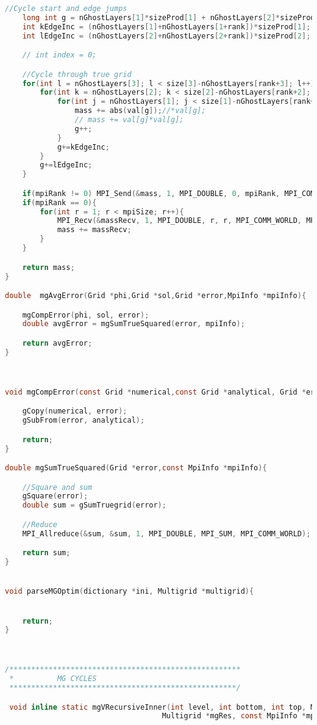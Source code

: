 \begin{lstlisting}[language=c, caption = main routine]
	//Cycle start and edge jumps
	long int g = nGhostLayers[1]*sizeProd[1] + nGhostLayers[2]*sizeProd[2] + nGhostLayers[3]*sizeProd[3];
	int kEdgeInc = (nGhostLayers[1]+nGhostLayers[1+rank])*sizeProd[1];
	int lEdgeInc = (nGhostLayers[2]+nGhostLayers[2+rank])*sizeProd[2];

	// int index = 0;

	//Cycle through true grid
	for(int l = nGhostLayers[3]; l < size[3]-nGhostLayers[rank+3]; l++){
		for(int k = nGhostLayers[2]; k < size[2]-nGhostLayers[rank+2]; k++){
			for(int j = nGhostLayers[1]; j < size[1]-nGhostLayers[rank+1]; j++){
				mass += abs(val[g]);//*val[g];
				// mass += val[g]*val[g];
				g++;
			}
			g+=kEdgeInc;
		}
		g+=lEdgeInc;
	}

	if(mpiRank != 0) MPI_Send(&mass, 1, MPI_DOUBLE, 0, mpiRank, MPI_COMM_WORLD);
	if(mpiRank == 0){
		for(int r = 1; r < mpiSize; r++){
			MPI_Recv(&massRecv, 1, MPI_DOUBLE, r, r, MPI_COMM_WORLD, MPI_STATUS_IGNORE);
			mass += massRecv;
		}
	}

	return mass;
}

double	mgAvgError(Grid *phi,Grid *sol,Grid *error,MpiInfo *mpiInfo){

	mgCompError(phi, sol, error);
	double avgError = mgSumTrueSquared(error, mpiInfo);

	return avgError;
}



void mgCompError(const Grid *numerical,const Grid *analytical, Grid *error){

	gCopy(numerical, error);
	gSubFrom(error, analytical);

	return;
}

double mgSumTrueSquared(Grid *error,const MpiInfo *mpiInfo){

	//Square and sum
	gSquare(error);
	double sum = gSumTruegrid(error);

	//Reduce
	MPI_Allreduce(&sum, &sum, 1, MPI_DOUBLE, MPI_SUM, MPI_COMM_WORLD);

	return sum;
}


void parseMGOptim(dictionary *ini, Multigrid *multigrid){


	return;
}



/*****************************************************
 *			MG CYCLES
 ****************************************************/

 void inline static mgVRecursiveInner(int level, int bottom, int top, Multigrid *mgRho, Multigrid *mgPhi,
  									Multigrid *mgRes, const MpiInfo *mpiInfo){



\end{lstlisting}
